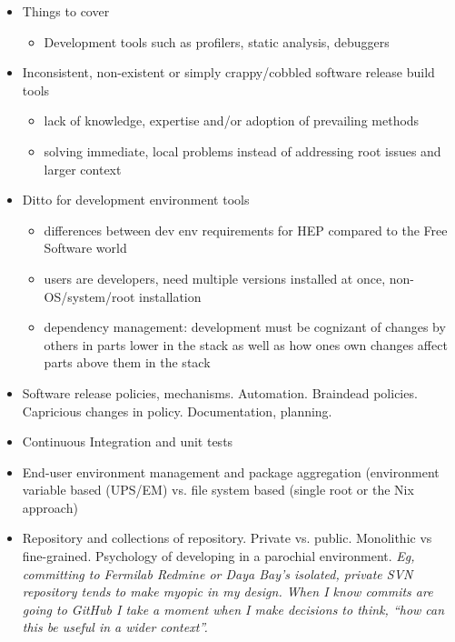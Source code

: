 \begin{itemize}
\item Things to cover
  \begin{itemize}
  \item Development tools such as profilers, static analysis, debuggers
  \end{itemize}
\item Inconsistent, non-existent or simply crappy/cobbled software release build tools
  \begin{itemize}
  \item lack of knowledge, expertise and/or adoption of prevailing methods
  \item solving immediate, local problems instead of addressing root issues and larger context
  \end{itemize}
\item Ditto for development environment tools
  \begin{itemize}
  \item differences between dev env requirements for HEP compared to the Free Software world
  \item users are developers, need multiple versions installed at once, non-OS/system/root installation
  \item dependency management: development must be cognizant of changes by others in parts lower in the stack as well as how ones own changes affect parts above them in the stack
  \end{itemize}
\item Software release policies, mechanisms.  Automation.  Braindead policies.  Capricious changes in policy.  Documentation, planning.
\item Continuous Integration and unit tests
\item End-user environment management and package aggregation (environment variable based (UPS/EM) vs. file system based (single root or the Nix approach)
\item Repository and collections of repository.  Private vs. public.  Monolithic vs fine-grained.  Psychology of developing in a parochial environment.  \textit{Eg, committing to Fermilab Redmine or Daya Bay's  isolated, private SVN repository tends to make myopic in my design.  When I know commits are going to GitHub I take a moment when I make decisions to think, ``how can this be useful in a wider context''.}
\end{itemize}

